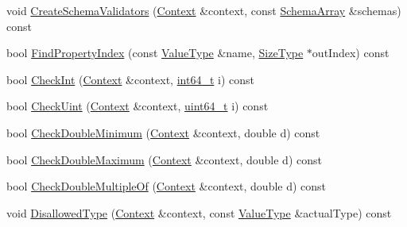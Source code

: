 \begin{DoxyCompactItemize}
void \mbox{\hyperlink{classrapidjson_1_1internal_1_1_schema_ae8b6a84896bc860c0aceaf8101705134}{Create\+Schema\+Validators}} (\mbox{\hyperlink{classrapidjson_1_1internal_1_1_schema_afca06b1f51d1bc18403bdf3f4d55ffef}{Context}} \&context, const \mbox{\hyperlink{structrapidjson_1_1internal_1_1_schema_1_1_schema_array}{Schema\+Array}} \&schemas) const
\item 
bool \mbox{\hyperlink{classrapidjson_1_1internal_1_1_schema_a6ee8add5fcc29c44c6f51ce2e66a26b9}{Find\+Property\+Index}} (const \mbox{\hyperlink{classrapidjson_1_1internal_1_1_schema_a3979a9083c598195927c08c6e3ba91d1}{Value\+Type}} \&name, \mbox{\hyperlink{namespacerapidjson_a44eb33eaa523e36d466b1ced64b85c84}{Size\+Type}} $\ast$out\+Index) const
\item 
bool \mbox{\hyperlink{classrapidjson_1_1internal_1_1_schema_a0c8092ad61f0487a1d460a1df817b885}{Check\+Int}} (\mbox{\hyperlink{classrapidjson_1_1internal_1_1_schema_afca06b1f51d1bc18403bdf3f4d55ffef}{Context}} \&context, \mbox{\hyperlink{stdint_8h_a414156feea104f8f75b4ed9e3121b2f6}{int64\+\_\+t}} i) const
\item 
bool \mbox{\hyperlink{classrapidjson_1_1internal_1_1_schema_ade6cff392d601ee17025e327f54a0c2d}{Check\+Uint}} (\mbox{\hyperlink{classrapidjson_1_1internal_1_1_schema_afca06b1f51d1bc18403bdf3f4d55ffef}{Context}} \&context, \mbox{\hyperlink{stdint_8h_aec6fcb673ff035718c238c8c9d544c47}{uint64\+\_\+t}} i) const
\item 
bool \mbox{\hyperlink{classrapidjson_1_1internal_1_1_schema_ad00261450ebdecf05a5bd4087a730550}{Check\+Double\+Minimum}} (\mbox{\hyperlink{classrapidjson_1_1internal_1_1_schema_afca06b1f51d1bc18403bdf3f4d55ffef}{Context}} \&context, double d) const
\item 
bool \mbox{\hyperlink{classrapidjson_1_1internal_1_1_schema_a782d4890206dae9f5a6d25fc2ace2e56}{Check\+Double\+Maximum}} (\mbox{\hyperlink{classrapidjson_1_1internal_1_1_schema_afca06b1f51d1bc18403bdf3f4d55ffef}{Context}} \&context, double d) const
\item 
bool \mbox{\hyperlink{classrapidjson_1_1internal_1_1_schema_af96186f55907a395e306cfda20a0e81c}{Check\+Double\+Multiple\+Of}} (\mbox{\hyperlink{classrapidjson_1_1internal_1_1_schema_afca06b1f51d1bc18403bdf3f4d55ffef}{Context}} \&context, double d) const
\item 
void \mbox{\hyperlink{classrapidjson_1_1internal_1_1_schema_af83b48bf2e3899dc90c8d20253bd49c5}{Disallowed\+Type}} (\mbox{\hyperlink{classrapidjson_1_1internal_1_1_schema_afca06b1f51d1bc18403bdf3f4d55ffef}{Context}} \&context, const \mbox{\hyperlink{classrapidjson_1_1internal_1_1_schema_a3979a9083c598195927c08c6e3ba91d1}{Value\+Type}} \&actual\+Type) const
\end{DoxyCompactItemize}
